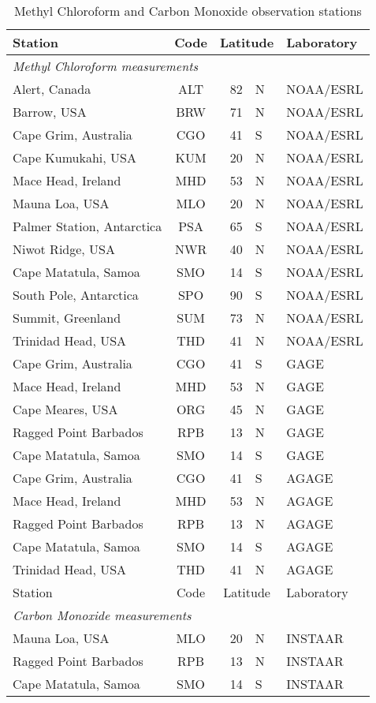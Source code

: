 \documentclass[grl]{agutexSI2019}
\begin{document}
\pagebreak
\begin{table} [ht] 
\caption{Methyl Chloroform and Carbon Monoxide observation stations \label{tbl:sites2}}
\begin{tabular}{lcr@{$^\circ$}ll}
\hline
Station						&	Code	&	\multicolumn{2}{c}{Latitude}	&	Laboratory			\\
\hline
\multicolumn{5}{l}{\hspace{-5pt}\textit{Methyl Chloroform measurements}}	\\
Alert, Canada				&	ALT		&	82	&	N						&	NOAA/ESRL		\\
Barrow, USA					&	BRW		&	71	&	N						&	NOAA/ESRL		\\
Cape Grim, Australia		&	CGO		&	41	&	S						&	NOAA/ESRL		\\
Cape Kumukahi, USA			&	KUM		&	20	&	N						&	NOAA/ESRL		\\
Mace Head, Ireland			&	MHD		&	53	&	N						&	NOAA/ESRL		\\
Mauna Loa, USA				&	MLO		&	20	&	N						&	NOAA/ESRL		\\
Palmer Station, Antarctica	&	PSA		&	65	&	S						&	NOAA/ESRL		\\
Niwot Ridge, USA			&	NWR		&	40	&	N						&	NOAA/ESRL		\\
Cape Matatula, Samoa		&	SMO		&	14	&	S						&	NOAA/ESRL		\\
South Pole, Antarctica		&	SPO		&	90	&	S						&	NOAA/ESRL		\\
Summit, Greenland			&	SUM		&	73	&	N						&	NOAA/ESRL		\\
Trinidad Head, USA			&	THD		&	41	&	N						&	NOAA/ESRL		\\
Cape Grim, Australia		&	CGO		&	41	&	S						&	GAGE			\\
Mace Head, Ireland			&	MHD		&	53	&	N						&	GAGE			\\
Cape Meares, USA			&	ORG		&	45	&	N						&	GAGE			\\
Ragged Point Barbados		&	RPB		&	13	&	N						&	GAGE			\\
Cape Matatula, Samoa		&	SMO		&	14	&	S						&	GAGE			\\
Cape Grim, Australia		&	CGO		&	41	&	S						&	AGAGE			\\
Mace Head, Ireland			&	MHD		&	53	&	N						&	AGAGE			\\
Ragged Point Barbados		&	RPB		&	13	&	N						&	AGAGE			\\
Cape Matatula, Samoa		&	SMO		&	14	&	S						&	AGAGE			\\
Trinidad Head, USA			&	THD		&	41	&	N						&	AGAGE			\\
\hline
Station						&	Code	&	\multicolumn{2}{c}{Latitude}	&	Laboratory			\\
\hline
\multicolumn{5}{l}{\hspace{-5pt}\textit{Carbon Monoxide measurements}}	\\
Mauna Loa, USA				&	MLO		&	20	&	N						&	INSTAAR		\\
Ragged Point Barbados		&	RPB		&	13	&	N						&	INSTAAR			\\
Cape Matatula, Samoa		&	SMO		&	14	&	S						&	INSTAAR		\\
\hline
\end{tabular}
\end{table}
\end{document}
